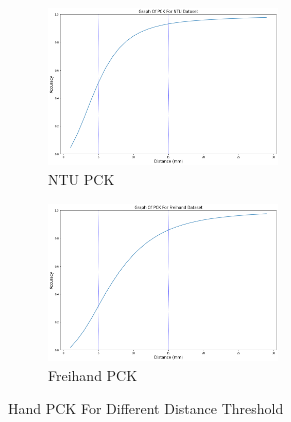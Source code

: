 \begin{figure}[ht]
    \begin{center}
        \begin{subfigure}[b]{0.49\textwidth}
            \includegraphics[width=230px]{assets/ntu_pck.png}
            \caption{NTU PCK}
            \label{fig:ntu_pck}
        \end{subfigure}
        \begin{subfigure}[b]{0.49\textwidth}
            \includegraphics[width=230px]{assets/freihand_pck.png}
            \caption{Freihand PCK}
            \label{fig:freihand_pck}
        \end{subfigure}
	    \caption{Hand PCK For Different Distance Threshold}
	    \label{fig:hand_pck_for_different_thresholds}        
    \end{center}
\end{figure}


\newpage
